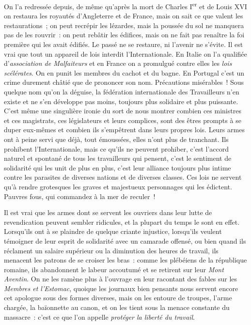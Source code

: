 \documentclass[french,twoside]{book} %
\begin{document}
On l’a redressée depuis, de même qu’après la mort de Charles I\textsuperscript{er} et de Louis XVI on restaura les royautés d’Angleterre et de France, mais on sait ce que valent les restaurations ; on peut recrépir les lézardes, mais la poussée du sol ne manquera pas de les rouvrir : on peut rebâtir les édifices, mais on ne fait pas renaître la foi première qui les avait édifiés. Le passé ne se restaure, ni l’avenir ne s’évite. Il est vrai que tout un appareil de lois interdit l’Internationale.  En Italie on l’a qualifiée d’\emph{association de Malfaiteurs} et en France on a promulgué contre elles les \emph{lois scélérates}. On en punit les membres du cachot et du bagne. En Portugal c’est un crime durement châtié que de prononcer son nom. Précautions misérables ! Sous quelque nom qu’on la déguise, la fédération internationale des Travailleurs n’en existe et ne s’en développe pas moins, toujours plus solidaire et plus puissante. C’est même une singulière ironie du sort de nous montrer combien ces ministres et ces magistrats, ces législateurs et leurs complices, sont des êtres prompts à se duper eux-mêmes et combien ils s’empêtrent dans leurs propres lois. Leurs armes ont à peine servi que déjà, tout émoussées,  elles n’ont plus de tranchant. Ils prohibent l’Internationale, mais ce qu’ils ne peuvent prohiber, c’est l’accord naturel et spontané de tous les travailleurs qui pensent, c’est le sentiment de solidarité qui les unit de plus en plus, c’est leur alliance toujours plus intime contre les parasites de diverses nations et de diverses classes. Ces lois ne servent qu’à rendre grotesques les graves et majestueux personnages qui les édictent. Pauvres fous, qui commandez à la mer de reculer !\par
Il est vrai que les armes dont se servent les ouvriers dans leur lutte de revendication peuvent sembler ridicules, et la plupart du temps le sont en effet. Lorsqu’ils ont à se plaindre de quelque criante injustice, lorsqu’ils veulent témoigner  de leur esprit de solidarité avec un camarade offensé, ou bien quand ils réclament un salaire supérieur ou la diminution des heures de travail, ils menacent les patrons de se croiser les bras : comme les plébéiens de la république romaine, ils abandonnent le labeur accoutumé et se retirent sur leur \emph{Mont Aventin}. On ne les ramène plus à l’ouvrage en leur racontant des fables sur les \emph{Membres et l’Estomac}, quoique les journaux bien pensants nous servent encore cet apologue sous des formes diverses, mais on les entoure de troupes, l’arme chargée, la baïonnette au canon, et on les tient sous la menace constante du massacre : c’est ce que l’on appelle \emph{protéger la liberté du travail}.\par
\end{document}
